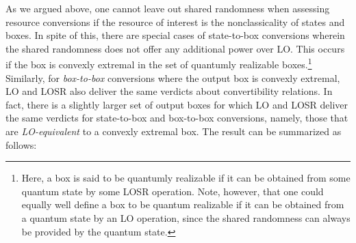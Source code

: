 \documentclass[12pt]{article}
\theoremstyle{plain}
\theoremstyle{definition}
\begin{document}
As we argued above, one cannot leave out shared randomness when assessing resource conversions
 if the resource of interest is the 
 nonclassicality of states and boxes.  In spite of this, there are special cases of state-to-box  conversions wherein the shared randomness does not offer any additional power over LO.  This occurs if the box is convexly extremal in the set of quantumly realizable boxes.\footnote{Here, a box is said to be quantumly realizable if it can be obtained from some quantum state by some LOSR operation. Note, however, that one could equally well define a box to be quantum realizable if it can be obtained from a quantum state by an LO operation, since the shared randomness can always be provided by the quantum state.}
 Similarly, for {\em box-to-box} conversions where the output box is convexly extremal,  LO and LOSR also deliver the same verdicts about convertibility relations. In fact, there is a slightly larger set of output boxes for which LO and LOSR deliver the same verdicts for state-to-box and box-to-box conversions, namely, those that are {\em LO-equivalent} to a convexly extremal box. The result can be summarized as follows:
 
\end{document}
